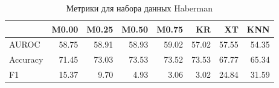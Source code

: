 \begin{table}
\caption{Метрики для набора данных Haberman}
\label{tab:Haberman}
\begin{tabular}{lrrrrrrr}
\toprule
 & M0.00 & M0.25 & M0.50 & M0.75 & KR & XT & KNN \\
\midrule
AUROC & 58.75 & 58.91 & 58.93 & 59.02 & 57.02 & 57.55 & 54.35 \\
Accuracy & 71.45 & 73.03 & 73.53 & 73.52 & 73.53 & 67.77 & 65.34 \\
F1 & 15.37 & 9.70 & 4.93 & 3.06 & 3.02 & 24.84 & 31.59 \\
\bottomrule
\end{tabular}
\end{table}
